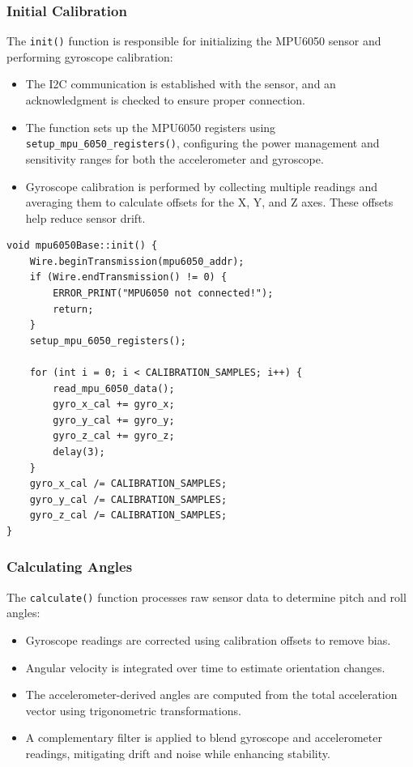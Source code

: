 \subsubsection{Initial Calibration}
The \texttt{init()} function is responsible for initializing the MPU6050 sensor and performing gyroscope calibration:
\begin{itemize}
	\item The I2C communication is established with the sensor, and an acknowledgment is checked to ensure proper connection.
	\item The function sets up the MPU6050 registers using \texttt{setup\_mpu\_6050\_registers()}, configuring the power management and sensitivity ranges for both the accelerometer and gyroscope.
	\item Gyroscope calibration is performed by collecting multiple readings and averaging them to calculate offsets for the X, Y, and Z axes. These offsets help reduce sensor drift.
\end{itemize}

\begin{lstlisting}[style=cppstyle2]
void mpu6050Base::init() {
	Wire.beginTransmission(mpu6050_addr);
	if (Wire.endTransmission() != 0) {
		ERROR_PRINT("MPU6050 not connected!");
		return;
	}
	setup_mpu_6050_registers();
	
	for (int i = 0; i < CALIBRATION_SAMPLES; i++) {
		read_mpu_6050_data();
		gyro_x_cal += gyro_x;
		gyro_y_cal += gyro_y;
		gyro_z_cal += gyro_z;
		delay(3);
	}
	gyro_x_cal /= CALIBRATION_SAMPLES;
	gyro_y_cal /= CALIBRATION_SAMPLES;
	gyro_z_cal /= CALIBRATION_SAMPLES;
}
\end{lstlisting}

\subsubsection{Calculating Angles}
The \texttt{calculate()} function processes raw sensor data to determine pitch and roll angles:
\begin{itemize}
	\item Gyroscope readings are corrected using calibration offsets to remove bias.
	\item Angular velocity is integrated over time to estimate orientation changes.
	\item The accelerometer-derived angles are computed from the total acceleration vector using trigonometric transformations.
	\item A complementary filter is applied to blend gyroscope and accelerometer readings, mitigating drift and noise while enhancing stability.
\end{itemize}

